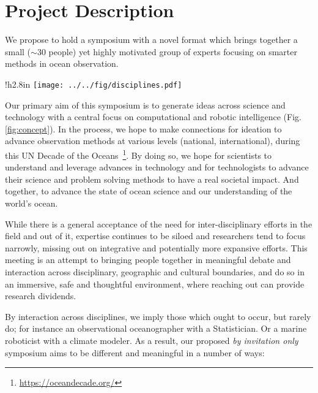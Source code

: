 \section{Project Description}
\label{sec:desc}

\noindent
We propose to hold a symposium with a novel format which brings
together a small ($\sim 30$ people) yet highly motivated group of
experts focusing on smarter methods in ocean observation.

\begin{wrapfigure}{!h}{2.8in}
  \vspace{-0.5cm}
  \centering 
  \texttt{[image: ../../fig/disciplines.pdf]}
  \caption{The expectation of multi-disciplinary presentations for the
    \sympe. Given the intimate nature of the event, not all these
    fields would likely be represented.}
  \label{fig:concept}
  \vspace{-0.5cm}
\end{wrapfigure}

Our primary aim of this symposium is to generate ideas across science
and technology with a central focus on computational and robotic
intelligence (Fig. \ref{fig:concept}).  In the process, we hope to
make connections for ideation to advance observation methods at
various levels (national, international), during this \textsf{UN
  Decade of the Oceans}~\footnote{\url{https://oceandecade.org/}}. By
doing so, we hope for scientists to understand and leverage advances
in technology and for technologists to advance their science and
problem solving methods to have a real societal impact. And together,
to advance the state of ocean science and our understanding of the
world's ocean.

While there is a general acceptance of the need for inter-disciplinary
efforts in the field and out of it, expertise continues to be siloed
and researchers tend to focus narrowly, missing out on integrative and
potentially more expansive efforts. This meeting is an attempt to
bringing people together in meaningful debate and interaction across
disciplinary, geographic and cultural boundaries, and do so in an
immersive, safe and thoughtful environment, where reaching out can
provide research dividends.

By interaction across disciplines, we imply those which ought to
occur, but rarely do; for instance an observational oceanographer with
a Statistician. Or a marine roboticist with a climate modeler. As a
result, our proposed \emph{by invitation only} symposium aims to be
different and meaningful in a number of ways:

